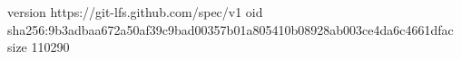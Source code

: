 version https://git-lfs.github.com/spec/v1
oid sha256:9b3adbaa672a50af39c9bad00357b01a805410b08928ab003ce4da6c4661dfac
size 110290
